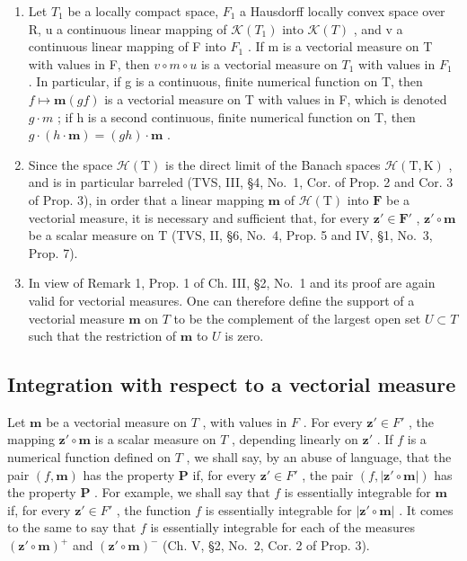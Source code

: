 \begin{enumerate}
\def\labelenumi{\arabic{enumi})}
\setcounter{enumi}{1}
\item
  Let \(T_{1}\) be a locally compact space, \(F_{1}\) a Hausdorff locally convex space over R, u a continuous linear mapping of \(\mathcal{K}(T_{1})\) into \(\mathcal{K}(T)\) , and v a continuous linear mapping of F into \(F_{1}\) . If m is a vectorial measure on T with values in F, then \(v \circ m \circ u\) is a vectorial measure on \(T_{1}\) with values in \(F_{1}\) . In particular, if g is a continuous, finite numerical function on T, then \(f \mapsto \mathbf{m}(gf)\) is a vectorial measure on T with values in F, which is denoted \(g \cdot m\) ; if h is a second continuous, finite numerical function on T, then \(g \cdot (h \cdot \mathbf{m}) = (gh) \cdot \mathbf{m}\) .
\item
  Since the space \(\mathcal{H}(\mathrm{T})\) is the direct limit of the Banach spaces \(\mathcal{H}(\mathrm{T},\mathrm{K})\) , and is in particular barreled (TVS, III, §4, No.~1, Cor. of Prop. 2 and Cor. 3 of Prop. 3), in order that a linear mapping \(\mathbf{m}\) of \(\mathcal{H}(\mathrm{T})\) into \(\mathbf{F}\) be a vectorial measure, it is necessary and sufficient that, for every \(\mathbf{z}' \in \mathbf{F}'\) , \(\mathbf{z}' \circ \mathbf{m}\) be a scalar measure on \(\mathrm{T}\) (TVS, II, §6, No.~4, Prop. 5 and IV, §1, No.~3, Prop. 7).
\item
  In view of Remark 1, Prop. 1 of Ch. III, §2, No.~1 and its proof are again valid for vectorial measures. One can therefore define the support of a vectorial measure \(\mathbf{m}\) on \(T\) to be the complement of the largest open set \(U \subset T\) such that the restriction of \(\mathbf{m}\) to \(U\) is zero.
\end{enumerate}

\subsection{Integration with respect to a vectorial measure}

Let \(\mathbf{m}\) be a vectorial measure on \(T\) , with values in \(F\) . For every \(\mathbf{z}' \in F'\) , the mapping \(\mathbf{z}' \circ \mathbf{m}\) is a scalar measure on \(T\) , depending linearly on \(\mathbf{z}'\) . If \(f\) is a numerical function defined on \(T\) , we shall say, by an abuse of language, that the pair \((f, \mathbf{m})\) has the property \(\boldsymbol{P}\) if, for every \(\mathbf{z}' \in F'\) , the pair \((f, |\mathbf{z}' \circ \mathbf{m}|)\) has the property \(\boldsymbol{P}\) . For example, we shall say that \(f\) is essentially integrable for \(\mathbf{m}\) if, for every \(\mathbf{z}' \in F'\) , the function \(f\) is essentially integrable for \(|\mathbf{z}' \circ \mathbf{m}|\) . It comes to the same to say that \(f\) is essentially integrable for each of the measures \((\mathbf{z}' \circ \mathbf{m})^+\) and \((\mathbf{z}' \circ \mathbf{m})^-\) (Ch. V, §2, No.~2, Cor. 2 of Prop. 3).

